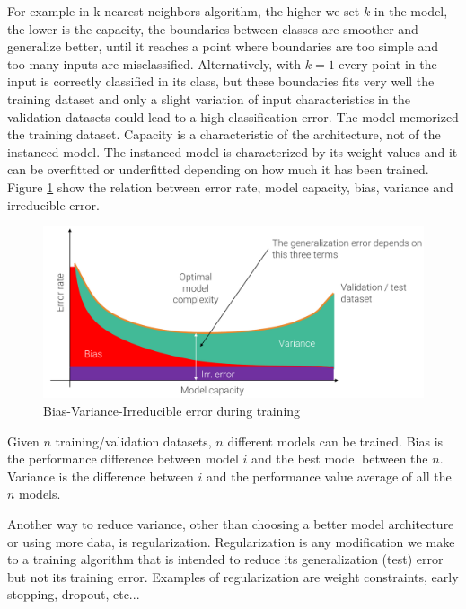 For example in k-nearest neighbors algorithm, the higher we set $k$ in the model, the lower is the capacity, the boundaries between classes are smoother and generalize better, until it reaches a point where boundaries are too simple and too many inputs are misclassified. Alternatively, with $k=1$ every point in the input is correctly classified in its class, but these boundaries fits very well the training dataset and only a slight variation of input characteristics in the validation datasets could lead to a high classification error. The model memorized the training dataset. Capacity is a characteristic of the architecture, not of the instanced model. The instanced model is characterized by its weight values and it can be overfitted or underfitted depending on how much it has been trained. Figure \ref{fig:bias_variance_training} show the relation between error rate, model capacity, bias, variance and irreducible error.

\begin{figure}[h]
    \includegraphics[width=13cm]{cap3/bias_variance_2.png}
    \caption[Bias, Variance and Irreducible error]{Bias-Variance-Irreducible error during training \cite{salti_cv} }  
    \label{fig:bias_variance_training}
\end{figure}



Given $n$ training/validation datasets, $n$ different models can be trained. Bias is the performance difference between model $i$ and the best model between the $n$. Variance is the difference between $i$ and the performance value average of  all the $n$ models.

\hfill \break

Another way to reduce variance, other than choosing a better model architecture or using more data, is regularization. Regularization is any modification we make to a training algorithm that is intended to reduce its generalization (test) error but not its training error. Examples of regularization are weight constraints, early stopping, dropout, etc...





